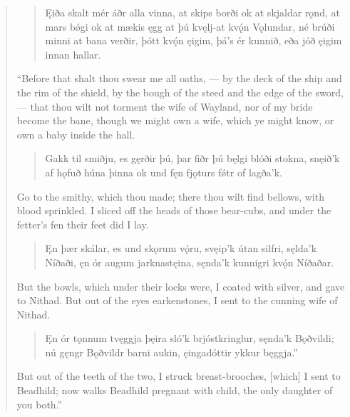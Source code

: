 \begin{verse}
\begin{verse}
\bva Ęiða skalt mér áðr \hld alla vinna,
at skips borði \hld ok at skjaldar rǫnd,
at mars bǿgi \hld ok at mækis ęgg
at þú kvęlj-at \hld kvǫ́n Vǫlundar,
né brúði minni \hld at bana verðir,
þótt kvǫ́n ęigim, \hld þá’s ér kunnið,
eða jóð ęigim \hld innan hallar. \\%
\end{verse}

\bvb “Before that shalt thou swear me all oaths, — by the deck of the ship and the rim of the shield, by the bough of the steed and the edge of the sword, — that thou wilt not torment the wife of Wayland, nor of my bride become the bane, though we might own a wife, which ye might know, or own a baby inside the hall.\footnotemark[1]

\begin{verse}
\bva Gakk til smiðju, \hld es gęrðir þú,
þar fiðr þú bęlgi \hld blóði stokna,
snęið’k af hǫfuð \hld húna þinna
ok und fęn fjǫturs \hld fǿtr of lagða’k. \\%
\end{verse}

\bvb Go to the smithy, which thou made; there thou wilt find bellows, with blood sprinkled. I sliced off the heads of those bear-cubs, and under the fetter’s fen their feet did I lay.

\begin{verse}
\bva Ęn þær skálar, \hld es und skǫrum vǫ́ru,
svęip’k útan silfri, \hld sęlda’k Níðaði,
ęn ór augum \hld jarknastęina,
sęnda'k kunnigri \hld kvǫ́n Níðaðar. \\%
\end{verse}

\bvb But the bowls, which under their locks were, I coated with silver, and gave to Nithad. But out of the eyes earkenstones, I sent to the cunning wife of Nithad.

\begin{verse}
\bva Ęn ór tǫnnum \hld tvęggja þęira
sló’k brjóstkringlur, \hld sęnda’k Bǫðvildi;
nú gęngr Bǫðvildr \hld barni aukin,
ęingadóttir \hld ykkur bęggja.” \\%
\end{verse}

\bvb But out of the teeth of the two, I struck breast-brooches, [which] I sent to Beadhild; now walks Beadhild pregnant with child, the only daughter of you both.”


\end{verse}
